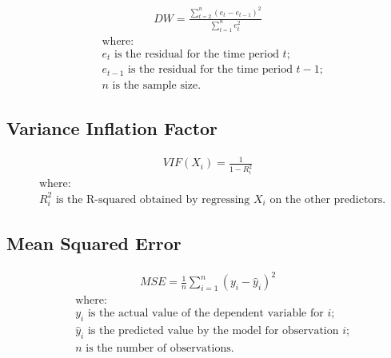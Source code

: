     \begin{equation}
    \label{annexes:equation-durbin-watson}
    \begin{aligned}
DW = \frac{\sum_{t=2}^{n} (e_t - e_{t-1})^2}{\sum_{t=1}^{n} e_t^2}
    \end{aligned}
    \end{equation}
\begin{align*}
    &\text{where:} \\
    &e_t \text{ is the residual for the time period } t\text{;} \\
    &e_{t-1} \text{ is the residual for the time period } t-1\text{;} \\
    &n \text{ is the sample size.}
\end{align*}

\subsection{Variance Inflation Factor}
    \label{annexes:methodologie-ols-vif}

    \begin{equation}
    \label{annexes:equation-vif}
    \begin{aligned}
VIF(X_i) = \frac{1}{1 - R_i^2}
    \end{aligned}
    \end{equation}
\begin{align*}
    &\text{where:} \\
    &R_i^2 \text{ is the R-squared obtained by regressing } X_i \text{ on the other predictors.}
\end{align*}

\subsection{Mean Squared Error}
    \label{annexes:methodologie-ols-mse}

    \begin{equation}
    \label{annexes:equation:mse}
    \begin{aligned}
MSE = \frac{1}{n} \sum_{i=1}^{n} (y_i - \hat{y}_i)^2
    \end{aligned}
    \end{equation}
\begin{align*}
    &\text{where:} \\
    &y_i \text{ is the actual value of the dependent variable for } i\text{;} \\
    &\hat{y}_i \text{ is the predicted value by the model for observation } i\text{;}\\
    &n \text{ is the number of observations.}
\end{align*}